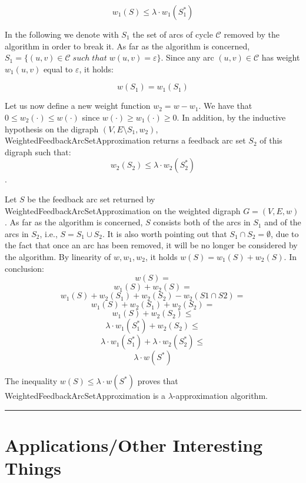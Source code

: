\documentclass{article}
\newenvironment{proof}{{\bf Proof:}}{\hfill\rule{2mm}{2mm}}
\begin{document}
\begin{proof}
    $$w_1(S) \leq \lambda \cdot w_1(S_1^*)$$

    In the following we denote with $S_1$ the set of arcs of cycle $\mathcal{C}$ removed by the algorithm in order to break it. As far as the algorithm is concerned, $S_1 = \{(u,v) \in \mathcal{C}\;such\;that\; w(u,v) = \varepsilon\}$. Since any arc $(u,v) \in \mathcal{C}$ has weight $w_1(u,v)$ equal to $\varepsilon$, it holds:
    
    $$w(S_1) = w_1(S_1)$$
    
    Let us now define a new weight function $w_2 = w-w_1$. We have that $0 \leq w_2(\cdot) \leq w(\cdot)$ since $w(\cdot) \geq w_1(\cdot) \geq 0$. In addition, by the inductive hypothesis on the digraph $(V, E\setminus S_1, w_2)$, {\sc WeightedFeedbackArcSetApproximation} returns a feedback arc set $S_2$ of this digraph such that: $$w_2(S_2) \leq \lambda \cdot w_2(S_2^*)$$.
    
    Let $S$ be the feedback arc set returned by {\sc WeightedFeedbackArcSetApproximation} on the weighted digraph $G = (V, E, w)$. As far as the algorithm is concerned, $S$ consists both of the arcs in $S_1$ and of the arcs in $S_2$, i.e., $S = S_1 \cup S_2$. It is also worth pointing out that $S_1 \cap S_2 = \emptyset$, due to the fact that once an arc has been removed, it will be no longer be considered by the algorithm. By linearity of $w, w_1, w_2$, it holds $w(S) = w_1(S) + w_2(S)$. In conclusion:
    \newpage
    $$w(S) =$$ 
    $$w_1(S) + w_2(S) =$$
    $$w_1(S) + w_2(S_1) + w_2(S_2) - w_2(S1 \cap S2) =$$
    $$w_1(S) + w_2(S_1) + w_2(S_2) =$$
    $$w_1(S) + w_2(S_2) \leq$$
    $$\lambda \cdot w_1(S_1^*) + w_2(S_2) \leq$$
    $$\lambda \cdot w_1(S_1^*) + \lambda \cdot w_2(S_2^*) \leq$$
    $$\lambda \cdot w(S^*)$$

    
    The inequality $w(S) \leq \lambda \cdot w(S^*)$ proves that {\sc WeightedFeedbackArcSetApproximation} is a $\lambda$-approximation algorithm.

\end{proof}

\section{Applications/Other Interesting Things}
\end{document}
